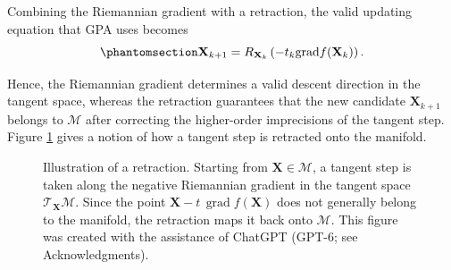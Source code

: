 \documentclass[
  12pt,
  letterpaper,
  article]{scrartcl}
\begin{document}
Combining the Riemannian gradient with a retraction, the valid updating
equation that GPA uses becomes
\begin{equation}\protect\phantomsection\label{eq-gpa_update}{
\mathbf{X}_{k+1} = R_{\mathbf{X}_k} \left(-t_k\text{grad}f(\mathbf{X}_k) \right).
}\end{equation}

Hence, the Riemannian gradient determines a valid descent direction in
the tangent space, whereas the retraction guarantees that the new
candidate \(\mathbf{X}_{k+1}\) belongs to \(\mathcal{M}\) after
correcting the higher-order imprecisions of the tangent step. Figure
\ref{fig:retraction} gives a notion of how a tangent step is retracted
onto the manifold.

\begin{figure}[!ht]
\centering
{}
\caption{Illustration of a retraction. Starting from $\mathbf{X}\in\mathcal{M}$, a tangent step is taken along the negative Riemannian gradient in the tangent space $\mathcal{T}_{\mathbf{X}}\mathcal{M}$. Since the point $\mathbf{X}-t\,\operatorname{grad}f(\mathbf{X})$ does not generally belong to the manifold, the retraction maps it back onto $\mathcal{M}$. This figure was created with the assistance of ChatGPT (GPT-6; see Acknowledgments).}
\label{fig:retraction}
\end{figure}
\end{document}
